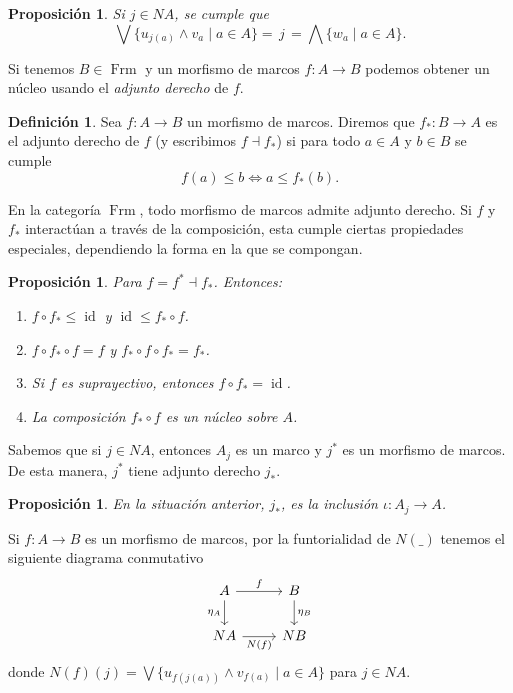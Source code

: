 \documentclass[11pt]{amsart}
\DeclareMathOperator{\id}{id}
\DeclareMathOperator{\Frm}{Frm}
\theoremstyle{plain}
\newtheorem{prop}[thm]{Proposición}
\theoremstyle{definition}
\newtheorem{dfn}[thm]{Definición}
\begin{document}
\begin{prop}\label{basenucleos}
Si $j\in NA$, se cumple que 
\[
\bigvee\{u_{j(a)}\wedge v_a\mid a\in A\}=\, j\, =\bigwedge\{w_a\mid a\in A\}.
\]
\end{prop}

Si tenemos $B\in \Frm$ y un morfismo de marcos $f\colon A\to B$ podemos obtener un núcleo usando el \emph{adjunto derecho} de $f$.

\begin{dfn}\label{adjunto}
Sea $f\colon A\to B$ un morfismo de marcos. Diremos que $f_*\colon B\to A$ es el adjunto derecho de $f$ (y escribimos $f\dashv f_*$) 
si para todo $a\in A$ y $b\in B$ se cumple
\[
f(a)\leq b\Longleftrightarrow a\leq f_*(b).
\]
\end{dfn}

En la categoría $\Frm$, todo morfismo de marcos admite adjunto derecho. Si $f$ y $f_*$ interactúan a través de la composición, esta cumple ciertas
propiedades especiales, dependiendo la forma en la que se compongan.

\begin{prop}\label{propadjunto}
    Para $f=f^*\dashv f_*$. Entonces:
    \begin{enumerate}
        \item $f\circ f_*\leq \id$ y $\id\leq f_*\circ f$.
        \item $f\circ f_*\circ f=f$ y $f_*\circ f\circ f_*=f_*$.
        \item Si $f$ es suprayectivo, entonces $f\circ f_*=\id$.
        \item La composición $f_*\circ f$ es un núcleo sobre $A$.   
    \end{enumerate}
\end{prop}

Sabemos que si $j\in NA$, entonces $A_j$ es un marco y $j^*$ es un morfismo de marcos. De esta manera, $j^*$ tiene adjunto derecho $j_*$.
\begin{prop}
     En la situación anterior, $j_*$, es la inclusión $\iota\colon A_j\to A$. 
\end{prop}

Si $f\colon A\to B$ es un morfismo de marcos, por la funtorialidad de $N(\_)$ tenemos el siguiente diagrama conmutativo
\[\begin{tikzcd}
	A & B \\
	NA & NB
	\arrow["f", from=1-1, to=1-2]
	\arrow["{\eta_A}"', from=1-1, to=2-1]
	\arrow["{\eta_B}", from=1-2, to=2-2]
	\arrow["{N(f)}"', from=2-1, to=2-2]
\end{tikzcd}\]
donde $N(f)(j)=\bigvee\{u_{f(j(a))}\wedge v_{f(a)}\mid a\in A\}$ para $j\in NA$.\\
\end{document}
